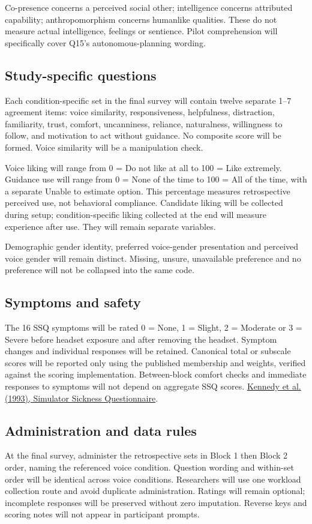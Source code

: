 \documentclass[11pt,letterpaper]{article}
\begin{document}
Co-presence concerns a perceived social other; intelligence concerns attributed capability; anthropomorphism concerns humanlike qualities. These do not measure actual intelligence, feelings or sentience. Pilot comprehension will specifically cover Q15's autonomous-planning wording.

\subsection{Study-specific questions}
Each condition-specific set in the final survey will contain twelve separate 1--7 agreement items: voice similarity, responsiveness, helpfulness, distraction, familiarity, trust, comfort, uncanniness, reliance, naturalness, willingness to follow, and motivation to act without guidance. No composite score will be formed. Voice similarity will be a manipulation check.

Voice liking will range from 0 = Do not like at all to 100 = Like extremely. Guidance use will range from 0 = None of the time to 100 = All of the time, with a separate Unable to estimate option. This percentage measures retrospective perceived use, not behavioral compliance. Candidate liking will be collected during setup; condition-specific liking collected at the end will measure experience after use. They will remain separate variables.

Demographic gender identity, preferred voice-gender presentation and perceived voice gender will remain distinct. Missing, unsure, unavailable preference and no preference will not be collapsed into the same code.

\subsection{Symptoms and safety}
The 16 SSQ symptoms will be rated 0 = None, 1 = Slight, 2 = Moderate or 3 = Severe before headset exposure and after removing the headset. Symptom changes and individual responses will be retained. Canonical total or subscale scores will be reported only using the published membership and weights, verified against the scoring implementation. Between-block comfort checks and immediate responses to symptoms will not depend on aggregate SSQ scores.
\href{https://doi.org/10.1207/s15327108ijap0303_3}{Kennedy et al. (1993), Simulator Sickness Questionnaire}.

\subsection{Administration and data rules}
At the final survey, administer the retrospective sets in Block 1 then Block 2 order, naming the referenced voice condition. Question wording and within-set order will be identical across voice conditions. Researchers will use one workload collection route and avoid duplicate administration. Ratings will remain optional; incomplete responses will be preserved without zero imputation. Reverse keys and scoring notes will not appear in participant prompts.
\end{document}
